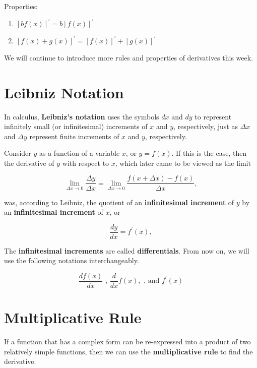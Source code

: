\documentclass[
]{book}
\begin{document}
Properties:

\begin{enumerate}
\def\labelenumi{\arabic{enumi}.}
\item
  \([bf(x)]^\prime = b[f(x)]^\prime\)
\item
  \([f(x) + g(x)]^\prime = [f(x)]^\prime + [g(x)]^\prime\)
\end{enumerate}

We will continue to introduce more rules and properties of derivatives this week.

\hfill\break

\hypertarget{leibniz-notation}{%
\section{Leibniz Notation}\label{leibniz-notation}}

In calculus, \textbf{Leibniz's notation} uses the symbols \(dx\) and \(dy\) to represent infinitely small (or infinitesimal) increments of \(x\) and \(y\), respectively, just as \(\Delta x\) and \(\Delta y\) represent finite increments of \(x\) and \(y\), respectively.

Consider \(y\) as a function of a variable \(x\), or \(y = f(x)\). If this is the case, then the derivative of \(y\) with respect to \(x\), which later came to be viewed as the limit

\[
\lim_{{\Delta x\rightarrow 0}}{\frac {\Delta y}{\Delta x}}=\lim_{{\Delta x\rightarrow 0}}{\frac  {f(x+\Delta x)-f(x)}{\Delta x}},
\]

was, according to Leibniz, the quotient of an \textbf{infinitesimal increment} of \(y\) by an \textbf{infinitesimal increment} of \(x\), or

\[
\frac{dy}{dx}=f^\prime(x),
\]

The \textbf{infinitesimal increments} are called \textbf{differentials}. From now on, we will use the following notations interchangeably.

\[
\frac{d f(x)}{dx} \text{ , } \frac{d}{dx}f(x), \text{ , and } f^\prime (x)
\]

\hfill\break

\hypertarget{multiplicative-rule}{%
\section{Multiplicative Rule}\label{multiplicative-rule}}

If a function that has a complex form can be re-expressed into a product of two relatively simple functions, then we can use the \textbf{multiplicative rule} to find the derivative.
\end{document}
